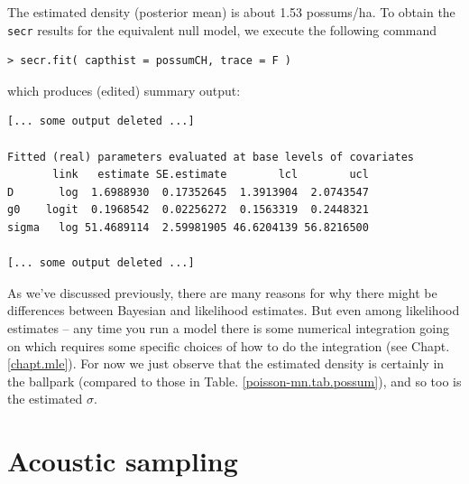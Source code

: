 The estimated density (posterior mean) is about 1.53 possums/ha.
To obtain the \mbox{\tt secr} results for the equivalent null model, we execute the following command
\begin{verbatim}
> secr.fit( capthist = possumCH, trace = F )
\end{verbatim}
which produces (edited) summary output:
\begin{verbatim}
[... some output deleted ...]

Fitted (real) parameters evaluated at base levels of covariates
       link   estimate SE.estimate        lcl        ucl
D       log  1.6988930  0.17352645  1.3913904  2.0743547
g0    logit  0.1968542  0.02256272  0.1563319  0.2448321
sigma   log 51.4689114  2.59981905 46.6204139 56.8216500

[... some output deleted ...]
\end{verbatim}
As we've discussed previously, there are many reasons for why there
might be differences between Bayesian and likelihood estimates.  But
even among likelihood estimates -- any time you run a model there is
some numerical integration going on which requires some specific
choices of how to do the integration (see Chapt. \ref{chapt.mle}).
For now we just observe that the estimated density is certainly in the
ballpark (compared to those in Table. \ref{poisson-mn.tab.possum}), and so too is the estimated $\sigma$.



\section{Acoustic sampling}
\label{poisson-mn.sec.acoustic}

